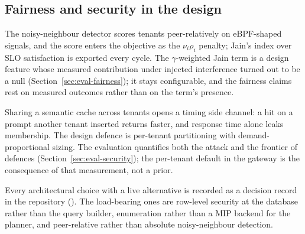 \subsection{Fairness and security in the design}
\label{sec:design-fairsec}

The noisy-neighbour detector scores tenants peer-relatively on
eBPF-shaped signals, and the score enters the objective as the
$\nu_i\rho_i$ penalty; Jain's index over SLO satisfaction is exported
every cycle. The $\gamma$-weighted Jain term is a design feature whose
measured contribution under injected interference turned out to be a null
(Section~\ref{sec:eval-fairness}); it stays configurable, and the fairness
claims rest on measured outcomes rather than on the term's presence.

Sharing a semantic cache across tenants opens a timing side channel: a hit
on a prompt another tenant inserted returns faster, and response time
alone leaks membership. The design defence is per-tenant partitioning with
demand-proportional sizing. The evaluation quantifies both the attack and
the frontier of defences (Section~\ref{sec:eval-security}); the
per-tenant default in the gateway is the consequence of that measurement,
not a prior.

Every architectural choice with a live alternative is recorded as a
decision record in the repository (). The load-bearing
ones are row-level security at the database rather than the query
builder, enumeration rather than a MIP backend for the planner, and
peer-relative rather than absolute noisy-neighbour detection.
